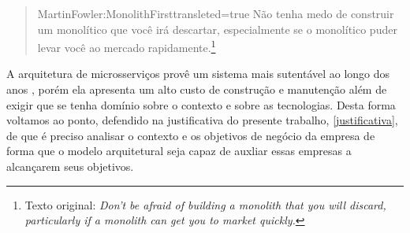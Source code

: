 \begin{quotation}{MartinFowler:MonolithFirst}{transleted=true}
    Não tenha medo de construir um monolítico que você irá descartar, especialmente se o monolítico
    puder levar você ao mercado rapidamente.\footnote{Texto original: \textit{ Don't be afraid of
    building a monolith that you will discard, particularly if a monolith can get you to market quickly.}}
\end{quotation}

A arquitetura de microsserviços provê um sistema mais sutentável ao longo dos anos
\cite{Guido2016:WhyMicroservices}, porém ela apresenta um alto custo de construção e
manutenção além de exigir que se tenha domínio sobre o contexto e sobre as tecnologias. Desta forma
voltamos ao ponto, defendido na justificativa do presente trabalho, \autoref{justificativa}, de que é preciso analisar o
contexto e os objetivos de negócio da empresa de forma que o modelo arquitetural seja capaz de
auxliar essas empresas a alcançarem seus objetivos.
